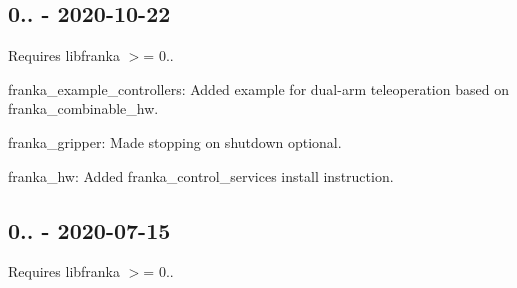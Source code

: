 \subsection*{0.. -\/ 2020-\/10-\/22}

Requires {\ttfamily libfranka} $>$= 0..


\begin{DoxyItemize}
\item {\ttfamily franka\+\_\+example\+\_\+controllers}\+: Added example for dual-\/arm teleoperation based on {\ttfamily franka\+\_\+combinable\+\_\+hw}.
\item {\ttfamily franka\+\_\+gripper}\+: Made stopping on shutdown optional.
\item {\ttfamily franka\+\_\+hw}\+: Added {\ttfamily franka\+\_\+control\+\_\+services} install instruction.
\end{DoxyItemize}

\subsection*{0.. -\/ 2020-\/07-\/15}

Requires {\ttfamily libfranka} $>$= 0..



